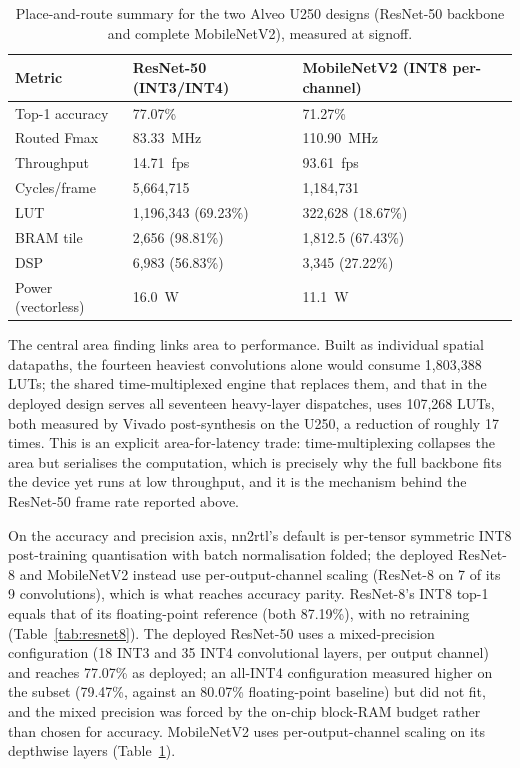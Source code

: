 \documentclass[acmtog,authorversion]{acmart}
\begin{document}
\begin{table}[t]
\centering
\caption{Place-and-route summary for the two Alveo U250 designs (ResNet-50 backbone and complete MobileNetV2), measured at signoff.}
\label{tab:fullnet}
\begin{tabular}{@{}p{}p{}p{}@{}}
\toprule
Metric & ResNet-50 (INT3/INT4) & MobileNetV2 (INT8 per-channel) \\
\midrule
Top-1 accuracy & 77.07\% & 71.27\% \\
Routed Fmax & 83.33~MHz & 110.90~MHz \\
Throughput & 14.71~fps & 93.61~fps \\
Cycles/frame & 5,664,715 & 1,184,731 \\
LUT & 1,196,343 (69.23\%) & 322,628 (18.67\%) \\
BRAM tile & 2,656 (98.81\%) & 1,812.5 (67.43\%) \\
DSP & 6,983 (56.83\%) & 3,345 (27.22\%) \\
Power (vectorless) & 16.0~W & 11.1~W \\
\bottomrule
\end{tabular}
\end{table}

The central area finding links area to performance. Built as individual spatial datapaths, the fourteen heaviest convolutions alone would consume 1,803,388 LUTs; the shared time-multiplexed engine that replaces them, and that in the deployed design serves all seventeen heavy-layer dispatches, uses 107,268 LUTs, both measured by Vivado post-synthesis on the U250, a reduction of roughly 17 times. This is an explicit area-for-latency trade: time-multiplexing collapses the area but serialises the computation, which is precisely why the full backbone fits the device yet runs at low throughput, and it is the mechanism behind the ResNet-50 frame rate reported above.

On the accuracy and precision axis, nn2rtl's default is per-tensor symmetric INT8 post-training quantisation with batch normalisation folded; the deployed ResNet-8 and MobileNetV2 instead use per-output-channel scaling (ResNet-8 on 7 of its 9 convolutions), which is what reaches accuracy parity. ResNet-8's INT8 top-1 equals that of its floating-point reference (both 87.19\%), with no retraining (Table~\ref{tab:resnet8}). The deployed ResNet-50 uses a mixed-precision configuration (18 INT3 and 35 INT4 convolutional layers, per output channel) and reaches 77.07\% as deployed; an all-INT4 configuration measured higher on the subset (79.47\%, against an 80.07\% floating-point baseline) but did not fit, and the mixed precision was forced by the on-chip block-RAM budget rather than chosen for accuracy. MobileNetV2 uses per-output-channel scaling on its depthwise layers (Table~\ref{tab:fullnet}).
\end{document}
